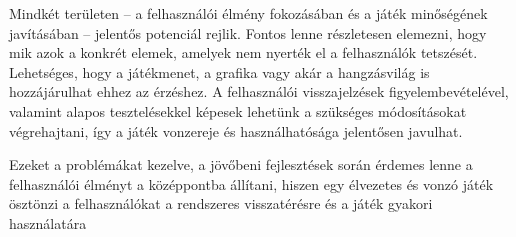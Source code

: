 Mindkét területen – a felhasználói élmény fokozásában és a játék minőségének javításában – jelentős potenciál rejlik.
Fontos lenne részletesen elemezni, hogy mik azok a konkrét elemek, amelyek nem nyerték el a felhasználók tetszését.
Lehetséges, hogy a játékmenet, a grafika vagy akár a hangzásvilág is hozzájárulhat ehhez az érzéshez.
A felhasználói visszajelzések figyelembevételével, valamint alapos tesztelésekkel képesek lehetünk a szükséges módosításokat végrehajtani, így a játék vonzereje és használhatósága jelentősen javulhat.

Ezeket a problémákat kezelve, a jövőbeni fejlesztések során érdemes lenne a felhasználói élményt a középpontba állítani, hiszen egy élvezetes és vonzó játék ösztönzi a felhasználókat a rendszeres visszatérésre és a játék gyakori használatára
